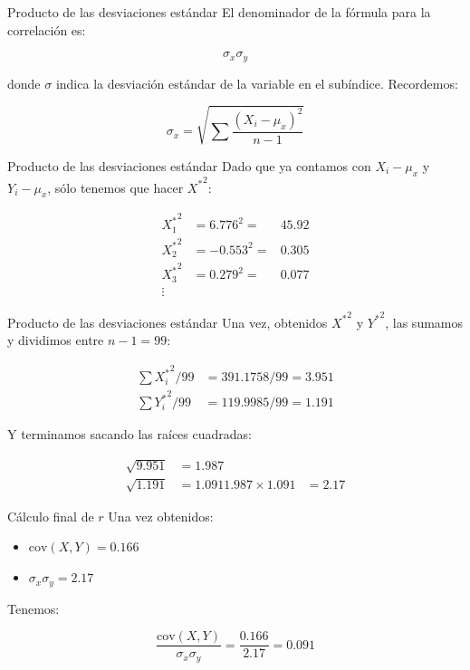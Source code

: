 \documentclass[
  11pt,
  ignorenonframetext,
]{beamer}
\providecommand{\tightlist}{%
  \setlength{\itemsep}{0pt}\setlength{\parskip}{0pt}}
\begin{document}
\begin{frame}{Producto de las desviaciones estándar}
\protect\hypertarget{producto-de-las-desviaciones-estuxe1ndar}{}
El denominador de la fórmula para la correlación es:

\begin{equation*}
\sigma_x \sigma_y
\end{equation*}

donde \(\sigma\) indica la desviación estándar de la variable en el
subíndice. Recordemos:

\begin{equation}
\sigma_x = \sqrt{\sum \frac{(X_i - \mu_x)^2}{n-1}}
\end{equation}
\end{frame}

\begin{frame}{Producto de las desviaciones estándar}
\protect\hypertarget{producto-de-las-desviaciones-estuxe1ndar-1}{}
Dado que ya contamos con \(X_i - \mu_x\) y \(Y_i - \mu_x\), sólo tenemos
que hacer \({X^*}^2\):

\begin{align*}
{X^*_1}^2 & = 6.776^2 = & 45.92 \\
{X^*_2}^2 & = -0.553^2 = & 0.305 \\
{X^*_3}^2 & = 0.279^2 = & 0.077 \\
\vdots
\end{align*}
\end{frame}

\begin{frame}{Producto de las desviaciones estándar}
\protect\hypertarget{producto-de-las-desviaciones-estuxe1ndar-2}{}
Una vez, obtenidos \({X^*}^2\) y \({Y^*}^2\), las sumamos y dividimos
entre \(n-1 = 99\):

\begin{align*}
\sum {X^*_i}^2/99 & = 391.1758/99 = 3.951\\
\sum {Y^*_i}^2/99 & = 119.9985/99 = 1.191
\end{align*}

Y terminamos sacando las raíces cuadradas:

\begin{align*}
\sqrt{9.951} & = 1.987\\
\sqrt{1.191} & = 1.091
1.987 \times 1.091 & = 2.17
\end{align*}
\end{frame}

\begin{frame}{Cálculo final de \(r\)}
\protect\hypertarget{cuxe1lculo-final-de-r}{}
Una vez obtenidos:

\begin{itemize}
\tightlist
\item
  \(\mathrm{cov}(X, Y) = 0.166\)
\item
  \(\sigma_x \sigma_y = 2.17\)
\end{itemize}

Tenemos:

\begin{equation*}
 \frac{\mathrm{cov}(X, Y)}{\sigma_x \sigma_y} = \frac{0.166}{2.17} = 0.091
\end{equation*}
\end{frame}
\end{document}
